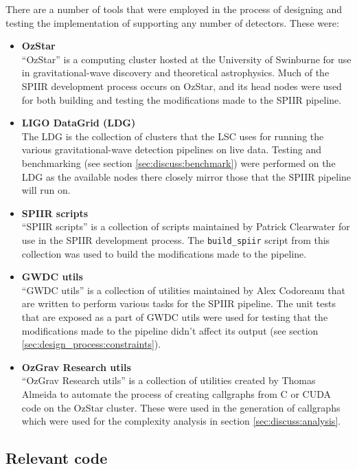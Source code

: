 \documentclass{article}
\begin{document}
There are a number of tools that were employed in the process of designing and testing the implementation of supporting any number of detectors.
These were:
\begin{itemize}
    \item \textbf{OzStar \cite{ozstar}}\\
        ``OzStar'' is a computing cluster hosted at the University of Swinburne for use in gravitational-wave discovery and theoretical astrophysics.
        Much of the SPIIR development process occurs on OzStar, and its head nodes were used for both building and testing the modifications made to the SPIIR pipeline.
    \item \textbf{LIGO DataGrid (LDG) \cite{ldg}}\\
        The LDG is the collection of clusters that the LSC uses for running the various gravitational-wave detection pipelines on live data.
        Testing and benchmarking (see section \ref{sec:discuss:benchmark}) were performed on the LDG as the available nodes there closely mirror those that the SPIIR pipeline will run on.
    \item \textbf{SPIIR scripts \cite{build_spiir}}\\
        ``SPIIR scripts'' is a collection of scripts maintained by Patrick Clearwater for use in the SPIIR development process.
        The \texttt{build\_spiir} script from this collection was used to build the modifications made to the pipeline.
    \item \textbf{GWDC utils \cite{gwdc_utils}}\\
        ``GWDC utils'' is a collection of utilities maintained by Alex Codoreanu that are written to perform various tasks for the SPIIR pipeline.
        The unit tests that are exposed as a part of GWDC utils were used for testing that the modifications made to the pipeline didn't affect its output (see section \ref{sec:design_process:constraints}).
    \item \textbf{OzGrav Research utils \cite[\texttt{utils/}]{ozgrav_research}}\\
        ``OzGrav Research utils'' is a collection of utilities created by Thomas Almeida to automate the process of creating callgraphs from C or CUDA code on the OzStar cluster.
        These were used in the generation of callgraphs which were used for the complexity analysis in section \ref{sec:discuss:analysis}.
\end{itemize}

\subsection{Relevant code} \label{sec:design_process:code}
\end{document}
